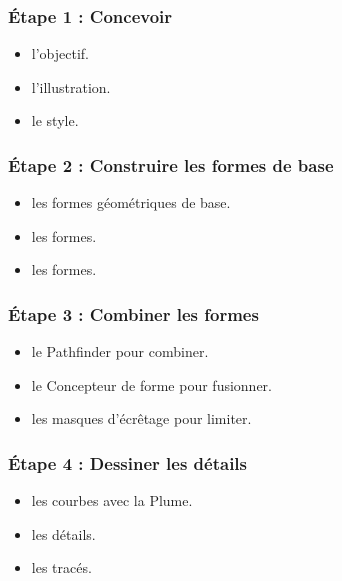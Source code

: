 \subsubsection{Étape 1 : Concevoir}

\begin{itemize}
    \item {} l'objectif.
    \item {} l'illustration.
    \item {} le style.
\end{itemize}

\subsubsection{Étape 2 : Construire les formes de base}

\begin{itemize}
    \item {} les formes géométriques de base.
    \item {} les formes.
    \item {} les formes.
\end{itemize}

\subsubsection{Étape 3 : Combiner les formes}

\begin{itemize}
    \item {} le Pathfinder pour combiner.
    \item {} le Concepteur de forme pour fusionner.
    \item {} les masques d'écrêtage pour limiter.
\end{itemize}

\subsubsection{Étape 4 : Dessiner les détails}

\begin{itemize}
    \item {} les courbes avec la Plume.
    \item {} les détails.
    \item {} les tracés.
\end{itemize}

